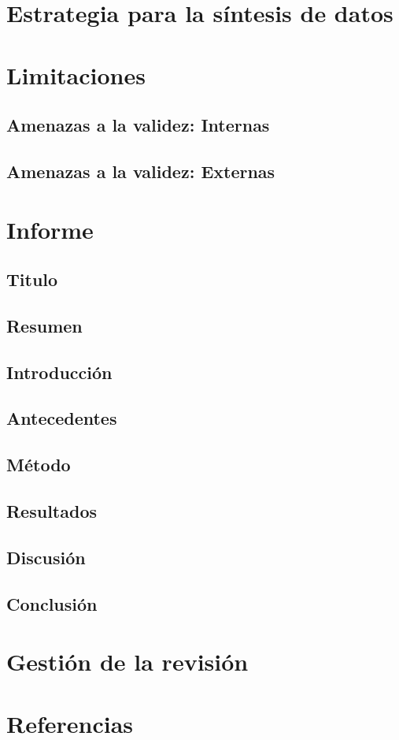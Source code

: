 \documentclass{article}
\begin{document}
\section{Estrategia para la síntesis de datos}
\section{Limitaciones}
\subsection{Amenazas a la validez: Internas}
\subsection{Amenazas a la validez: Externas}
\section{Informe}
\subsection{Titulo}
\subsection{Resumen}
\subsection{Introducción}
\subsection{Antecedentes}
\subsection{Método}
\subsection{Resultados}
\subsection{Discusión}
\subsection{Conclusión}
\section{Gestión de la revisión}
\section{Referencias}
\end{document}
